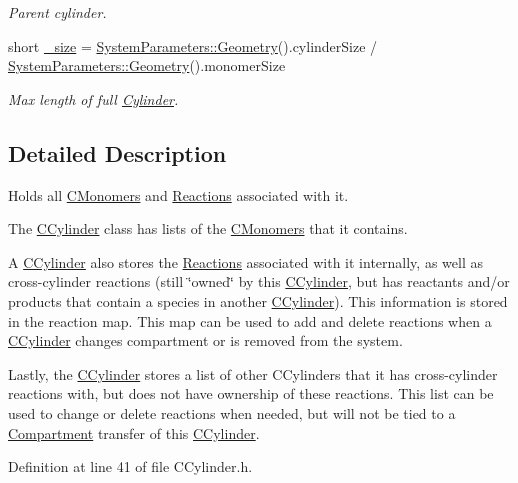 \begin{DoxyCompactItemize}
\begin{DoxyCompactList}\small\item\em Parent cylinder. \end{DoxyCompactList}\item 
short \hyperlink{classCCylinder_a9951ded0fd9d228a2358bee18f8b61b6}{\+\_\+size} = \hyperlink{classSystemParameters_a9211bca7e3422c076f4e9ba2dc29c599}{System\+Parameters\+::\+Geometry}().cylinder\+Size / \hyperlink{classSystemParameters_a9211bca7e3422c076f4e9ba2dc29c599}{System\+Parameters\+::\+Geometry}().monomer\+Size
\begin{DoxyCompactList}\small\item\em Max length of full \hyperlink{classCylinder}{Cylinder}. \end{DoxyCompactList}\end{DoxyCompactItemize}


\subsection{Detailed Description}
Holds all \hyperlink{classCMonomer}{C\+Monomers} and \hyperlink{classReaction}{Reactions} associated with it. 

The \hyperlink{classCCylinder}{C\+Cylinder} class has lists of the \hyperlink{classCMonomer}{C\+Monomers} that it contains.

A \hyperlink{classCCylinder}{C\+Cylinder} also stores the \hyperlink{classReaction}{Reactions} associated with it internally, as well as cross-\/cylinder reactions (still \char`\"{}owned\char`\"{} by this \hyperlink{classCCylinder}{C\+Cylinder}, but has reactants and/or products that contain a species in another \hyperlink{classCCylinder}{C\+Cylinder}). This information is stored in the reaction map. This map can be used to add and delete reactions when a \hyperlink{classCCylinder}{C\+Cylinder} changes compartment or is removed from the system.

Lastly, the \hyperlink{classCCylinder}{C\+Cylinder} stores a list of other C\+Cylinders that it has cross-\/cylinder reactions with, but does not have ownership of these reactions. This list can be used to change or delete reactions when needed, but will not be tied to a \hyperlink{classCompartment}{Compartment} transfer of this \hyperlink{classCCylinder}{C\+Cylinder}. 

Definition at line 41 of file C\+Cylinder.\+h.



